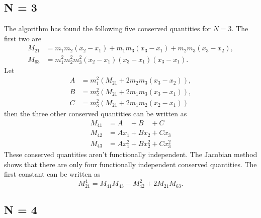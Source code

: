 \documentclass[english,master]{liumaiex}
\theoremstyle{plain}
\theoremstyle{definition}
\begin{document}
\subsection*{N = 3}

The algorithm has found the following five conserved quantities for $N = 3$.  The first two are
\begin{align}
	M_{21} &= m_1m_2(x_2 - x_1) + m_1m_3(x_3 - x_1) + m_2m_3(x_3 - x_2), \\
	M_{63} &= m_1^2m_2^2m_3^2(x_2 - x_1)(x_3 - x_1)(x_3 - x_1).
\end{align}
Let
\begin{align}
	A & = m_1^2(M_{21} + 2m_2m_3(x_3-x_2)), \\
	B & = m_2^2(M_{21} + 2m_1m_3(x_3-x_1)), \\
	C & = m_3^2(M_{21} + 2m_1m_2(x_2-x_1))
\end{align}
then the three other conserved quantities can be written as
\begin{align}
	M_{41} &= A\phantom{x_1} + B\phantom{x_2} + C\phantom{x_3} \\
	M_{42} &= Ax_1 + Bx_2 + Cx_3 \\
	M_{43} &= Ax_1^2 + Bx_2^2 + Cx_3^2
\end{align}
These conserved quantities aren't functionally independent. The Jacobian method shows that there are only four functionally independent conserved quantities. The first constant can be written as
\begin{equation}
	M_{21}^4 = M_{41}M_{43} - M_{42}^2 + 2M_{21}M_{63}.
\end{equation}


\subsection*{N = 4}
\end{document}
